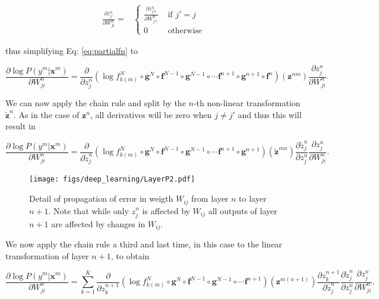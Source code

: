 \begin{align}
\frac{\partial z^n_{j'}}{\partial W_{ji}^n} =  
  &\begin{cases}
   \frac{\partial z^n_{j'i}}{\partial W_{j'i}^n}  &  \mbox{ if } j' = j\\ 
    0    &  \mbox{ otherwise } 
 \end{cases}
\end{align}

\noindent thus simplifying Eq: \ref{eq:partialfn} to

\begin{equation}
\frac{\partial \log P(y^m | \mathbf{x}^m)}{\partial W_{ji}^n} = \frac{\partial}{\partial z^n_{j}} (\log f_{k(m)}^N \circ \mathbf{g}^N \circ \mathbf{f}^{N-1} \circ \mathbf{g}^{N-1} \circ \cdots \mathbf{f}^{n+1} \circ \mathbf{g}^{n+1} \circ \mathbf{f}^{n})(\mathbf{z}^{nm})\frac{\partial z^n_{j}}{\partial W_{ji}^n}.
\label{eq:partialfn2}
\end{equation}

We can now apply the chain rule and split by the $n$-th non-linear transformation $\tilde{\mathbf{z}}^n$. As in the case of $\mathbf{z}^n$, all derivatives will be zero when $j\neq j'$ and thus this will result in

\begin{equation}
\frac{\partial \log P(y^m | \mathbf{x}^m)}{\partial W_{ji}^n} = \frac{\partial}{\partial \tilde{z}^{n}_{j}} (\log f_{k(m)}^N \circ \mathbf{g}^N \circ \mathbf{f}^{N-1} \circ \mathbf{g}^{N-1} \circ \cdots \mathbf{f}^{n+1} \circ \mathbf{g}^{n+1})(\tilde{\mathbf{z}}^{mn})\frac{\partial \tilde{z}^n_{j}}{\partial z_{j}^n}\frac{\partial z^n_{j}}{\partial W_{ji}^n} .
\label{eq:partialfn3}
\end{equation}


\begin{figure}
\centering
\texttt{[image: figs/deep\_learning/LayerP2.pdf]}
\caption{Detail of propagation of error in weigth $W_{ij}$ from layer $n$ to layer $n+1$. Note that while only $z_j^n$ is affected by $W_{ij}$ all outputs of layer $n+1$ are affected by changes in $W_{ij}$.}
\label{fig:LayerP2}
\end{figure}

We now apply the chain rule a third and last time, in this case to the linear transformation of layer $n+1$, to obtain

\begin{equation}
\frac{\partial \log P(y^m | \mathbf{x}^m)}{\partial W_{ji}^n} = \sum_{k=1}^K \frac{\partial}{\partial z^{n+1}_{k}} (\log f_{k(m)}^N \circ \mathbf{g}^N \circ \mathbf{f}^{N-1} \circ \mathbf{g}^{N-1} \circ \cdots \mathbf{f}^{n+1})(\mathbf{z}^{m(n+1)})\frac{\partial z^{n+1}_k}{\partial \tilde{z}_{j}^n}\frac{\partial \tilde{z}^n_{j}}{\partial z_{j}^n}\frac{\partial z^n_{j}}{\partial W_{ji}^n} .
\label{eq:partialfn4}
\end{equation}

